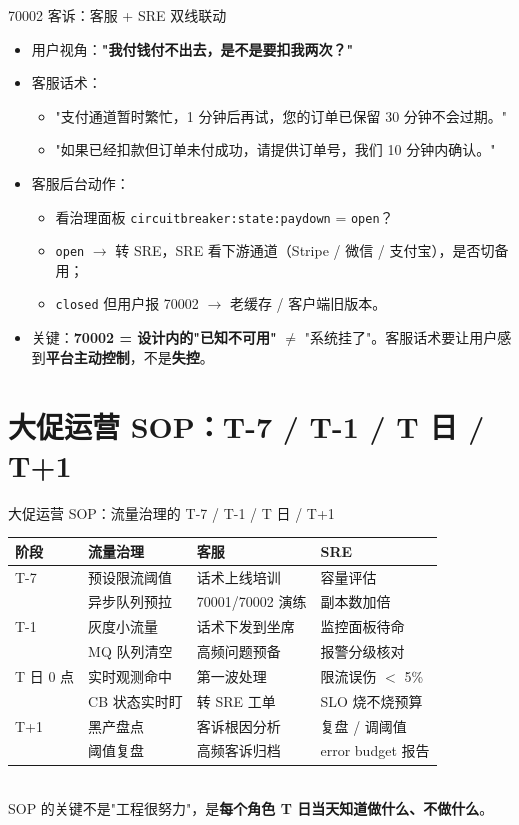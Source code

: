 \documentclass[aspectratio=169,11pt]{beamer}
\begin{document}
\begin{frame}[shrink]{70002 客诉：客服 + SRE 双线联动}
\begin{itemize}
  \item 用户视角：\textbf{"我付钱付不出去，是不是要扣我两次？"}
  \item 客服话术：
  \begin{itemize}
    \item "支付通道暂时繁忙，1 分钟后再试，您的订单已保留 30 分钟不会过期。"
    \item "如果已经扣款但订单未付成功，请提供订单号，我们 10 分钟内确认。"
  \end{itemize}
  \item 客服后台动作：
  \begin{itemize}
    \item 看治理面板 \texttt{circuitbreaker:state:paydown} = \texttt{open}？
    \item \texttt{open} $\to$ 转 SRE，SRE 看下游通道（Stripe / 微信 / 支付宝），是否切备用；
    \item \texttt{closed} 但用户报 70002 $\to$ 老缓存 / 客户端旧版本。
  \end{itemize}
  \item 关键：\textbf{70002 = 设计内的"已知不可用"} $\neq$ "系统挂了"。客服话术要让用户感到\textbf{平台主动控制}，不是\textbf{失控}。
\end{itemize}
\end{frame}

\section{大促运营 SOP：T-7 / T-1 / T 日 / T+1}

\begin{frame}[shrink]{大促运营 SOP：流量治理的 T-7 / T-1 / T 日 / T+1}
\footnotesize
\begin{tabular}{@{}p{1.4cm}p{2.6cm}p{2.8cm}p{3.0cm}@{}}
\toprule
阶段 & 流量治理 & 客服 & SRE \\
\midrule
T-7 & 预设限流阈值 & 话术上线培训 & 容量评估 \\
    & 异步队列预拉  & 70001/70002 演练 & 副本数加倍 \\
T-1 & 灰度小流量 & 话术下发到坐席 & 监控面板待命 \\
    & MQ 队列清空  & 高频问题预备 & 报警分级核对 \\
T 日 0 点 & 实时观测命中 & 第一波处理 & 限流误伤 $<$ 5\% \\
       & CB 状态实时盯 & 转 SRE 工单  & SLO 烧不烧预算 \\
T+1 & 黑产盘点 & 客诉根因分析 & 复盘 / 调阈值 \\
    & 阈值复盘 & 高频客诉归档 & error budget 报告 \\
\bottomrule
\end{tabular}
\vspace{2mm}\\
\small SOP 的关键不是"工程很努力"，是\textbf{每个角色 T 日当天知道做什么、不做什么}。
\end{frame}
\end{document}
